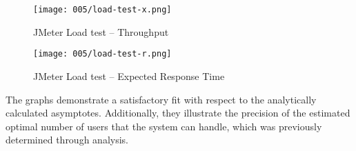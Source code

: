 \clearpage

\begin{figure}[h]
	\centering
	\texttt{[image: 005/load-test-x.png]}
	\caption{JMeter Load test -- Throughput}
\end{figure}

\clearpage

\begin{figure}[h]
	\centering
	\texttt{[image: 005/load-test-r.png]}
	\caption{JMeter Load test -- Expected Response Time}
\end{figure}

The graphs demonstrate a satisfactory fit with respect to the analytically calculated asymptotes.
Additionally, they illustrate the precision of the estimated optimal number of users that the system can handle, which was previously determined through analysis.
